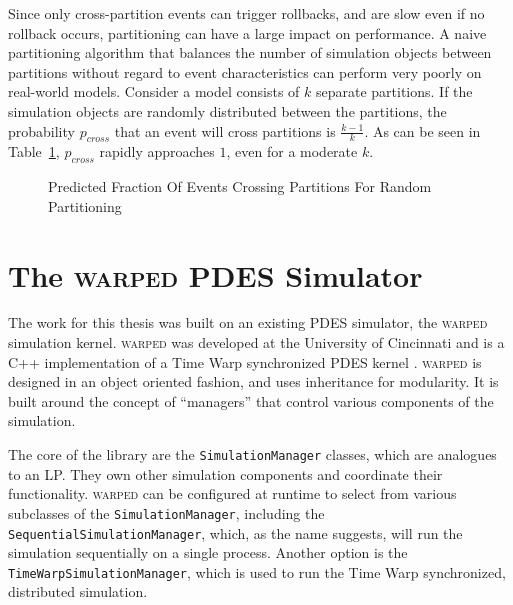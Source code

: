 \documentclass[11pt]{book}
\begin{document}
Since only cross-partition events can trigger rollbacks, and are slow even if no rollback occurs, partitioning can have a large impact on performance. A naive partitioning algorithm that balances the number of simulation objects between partitions without regard to event characteristics can perform very poorly on real-world models. Consider a model consists of \(k\) separate partitions. If the simulation objects are randomly distributed between the partitions, the probability \(p_{cross}\) that an event will cross partitions is \(\frac{k-1}{k}\). As can be seen in Table~\ref{fig:predictedEventCrossings}, \(p_{cross}\) rapidly approaches \(1\), even for a moderate \(k\).

\begin{figure}[h]\label{fig:predictedEventCrossings}
\centering
{}
\caption {Predicted Fraction Of Events Crossing Partitions For Random Partitioning}
\end{figure}

\section{The \textsc{warped} PDES Simulator}

The work for this thesis was built on an existing PDES simulator, the \textsc{warped} simulation kernel. \textsc{warped} was developed at the University of Cincinnati and is a C++ implementation of a Time Warp synchronized PDES kernel \cite{king-11}. \textsc{warped} is designed in an object oriented fashion, and uses inheritance for modularity. It is built around the concept of ``managers'' that control various components of the simulation.

The core of the library are the \texttt{SimulationManager} classes, which are analogues to an LP. They own other simulation components and coordinate their functionality. \textsc{warped} can be configured at runtime to select from various subclasses of the \texttt{SimulationManager}, including the \texttt{SequentialSimulationManager}, which, as the name suggests, will run the simulation sequentially on a single process. Another option is the \texttt{TimeWarpSimulationManager}, which is used to run the Time Warp synchronized, distributed simulation.
\end{document}
